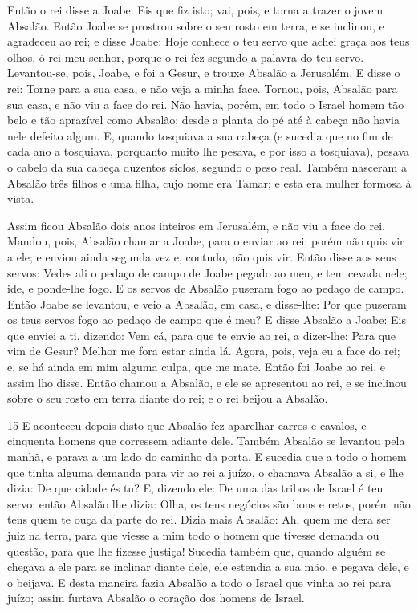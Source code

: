 Então o rei disse a Joabe: Eis que fiz isto; vai, pois, e torna a
trazer o jovem Absalão. Então Joabe se prostrou sobre o seu
rosto em terra, e se inclinou, e agradeceu ao rei; e disse Joabe:
Hoje conhece o teu servo que achei graça aos teus olhos, ó rei meu
senhor, porque o rei fez segundo a palavra do teu servo.
Levantou-se, pois, Joabe, e foi a Gesur, e trouxe Absalão a
Jerusalém. E disse o rei: Torne para a sua casa, e não veja a
minha face. Tornou, pois, Absalão para sua casa, e não viu a face do
rei. Não havia, porém, em todo o Israel homem tão belo e tão
aprazível como Absalão; desde a planta do pé até à cabeça não havia
nele defeito algum. E, quando tosquiava a sua cabeça (e
sucedia que no fim de cada ano a tosquiava, porquanto muito lhe
pesava, e por isso a tosquiava), pesava o cabelo da sua cabeça
duzentos siclos, segundo o peso real. Também nasceram a
Absalão três filhos e uma filha, cujo nome era Tamar; e esta era
mulher formosa à vista.

Assim ficou Absalão dois anos inteiros em Jerusalém, e não viu a
face do rei. Mandou, pois, Absalão chamar a Joabe, para o
enviar ao rei; porém não quis vir a ele; e enviou ainda segunda vez e, contudo, não quis vir. Então disse aos seus servos: Vedes
ali o pedaço de campo de Joabe pegado ao meu, e tem cevada nele;
ide, e ponde-lhe fogo. E os servos de Absalão puseram fogo ao pedaço de campo. Então Joabe se levantou, e veio a Absalão, em casa,
e disse-lhe: Por que puseram os teus servos fogo ao pedaço de campo que é meu? E disse Absalão a Joabe: Eis que enviei a ti,
dizendo: Vem cá, para que te envie ao rei, a dizer-lhe: Para que vim de Gesur? Melhor me fora estar ainda lá. Agora, pois, veja eu a face do rei; e, se há ainda em mim alguma culpa, que me mate.
Então foi Joabe ao rei, e assim lho disse. Então chamou a
Absalão, e ele se apresentou ao rei, e se inclinou sobre o seu rosto
em terra diante do rei; e o rei beijou a Absalão.

\medskip

\lettrine{15}{} E aconteceu depois disto que Absalão fez
aparelhar carros e cavalos, e cin\-quen\-ta homens que corressem adiante
dele. Também Absalão se levantou pela manhã, e parava a um lado
do caminho da porta. E sucedia que a todo o homem que tinha alguma
demanda para vir ao rei a juízo, o chamava Absalão a si, e lhe
dizia: De que cidade és tu? E, dizendo ele: De uma das tribos de
Israel é teu servo; então Absalão lhe dizia: Olha, os teus
negócios são bons e retos, porém não tens quem te ouça da parte do
rei. Dizia mais Absalão: Ah, quem me dera ser juiz na terra,
para que viesse a mim todo o homem que tivesse demanda ou questão,
para que lhe fizesse justiça! Sucedia também que, quando alguém
se chegava a ele para se inclinar diante dele, ele estendia a sua
mão, e pegava dele, e o beijava. E desta maneira fazia Absalão a
todo o Israel que vinha ao rei para juízo; assim furtava Absalão o
coração dos homens de Israel.


